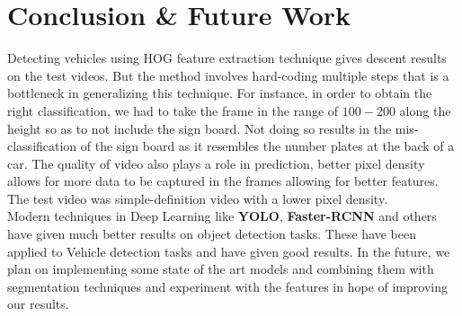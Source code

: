 \documentclass{article}
\begin{document}
\section{Conclusion \& Future Work}
Detecting vehicles using HOG feature extraction technique gives descent results on the test videos. But the method involves hard-coding multiple steps that is a bottleneck in generalizing this technique. For instance, in order to obtain the right classification, we had to take the frame in the range of $100-200$ along the height so as to not include the sign board. Not doing so results in the mis-classification of the sign board as it resembles the number plates at the back of a car. 
The quality of video also plays a role in prediction, better pixel density allows for more data to be captured in the frames allowing for better features. The test video was simple-definition video with a lower pixel density. \\
Modern techniques in Deep Learning like \textbf{YOLO}, \textbf{Faster-RCNN} and others have given much better results on object detection tasks. These have been applied to Vehicle detection tasks and have given good results. In the future, we plan on implementing some state of the art models and combining them with segmentation\cite{1412.7062} techniques and experiment with the features in hope of improving our results.   


  

\end{document}
